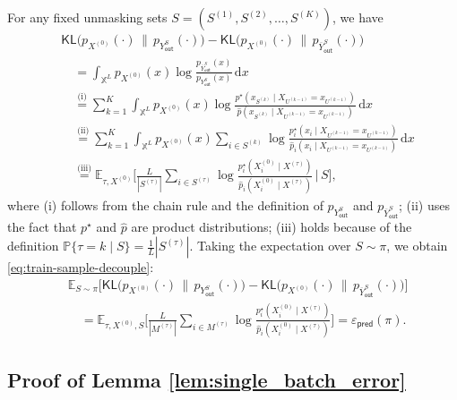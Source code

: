 \documentclass[english]{article}
\newcommand{\bP}{\mathbb{P}}
\newcommand{\KL}{\mathsf{KL}}
\newcommand{\diff}{\,\mathrm{d}}
\newcommand{\ol}{\overline}
\newcommand{\veps}{\varepsilon}
\newcommand{\train}{\mathsf{pred}}
\newcommand{\out}{\mathsf{out}}
\begin{document}
For any fixed unmasking sets $ S = (S^{(1)}, S^{(2)}, \ldots, S^{(K)} ) $, we have
\begin{align*}
    &\KL\big(p_{X^{(0)}}(\cdot) \,\|\, p_{Y_{\out}^S}(\cdot)\big) - \KL \big(p_{X^{(0)}}(\cdot) \,\|\, p_{\ol Y^S_{\out}}(\cdot)\big) \\
    &\quad = \int_{\mathbb{X}^L} p_{X^{(0)}}(x) \log \frac{p_{\ol Y^S_{\out}}(x)}{p_{Y_{\out}^S}(x)} \diff x \\
    &\quad \stackrel{\text{(i)}}{=} \sum_{k=1}^K \int_{\mathbb{X}^L} p_{X^{(0)}}(x) \log \frac{p^\star(x_{S^{(k)} }  \mid X_{U^{(k-1)} } = x_{U^{(k-1)} }  )}{\widehat{p}(x_{S^{(k)} }  \mid X_{U^{(k-1)} } = x_{U^{(k-1)} }  )} \diff x \\
    &\quad \stackrel{\text{(ii)}}{=} \sum_{k=1}^K \int_{\mathbb{X}^L} p_{X^{(0)}}(x) \sum_{i \in S^{(k)} } \log \frac{p_i^\star(x_i \mid X_{U^{(k-1)} } = x_{U^{(k-1)} } )}{\widehat{p}_i(x_i \mid X_{U^{(k-1)} } = x_{U^{(k-1)} } )} \diff x \\
    &\quad \stackrel{\text{(iii)}}{=} \mathbb{E}_{\tau, X^{(0)}} \Bigg[ \frac{L}{|S^{(\tau)}| } \sum_{i \in S^{(\tau)} } \log \frac{p_i^\star(X^{(0)}_i \mid X^{(\tau)} )}{\widehat{p}_i(X^{(0)}_i\mid X^{(\tau)} )} \, \Big| \, S \Bigg],
\end{align*}
where (i) follows from the chain rule and the definition of $ p_{Y_{\out}^S} $ and $ p_{\ol Y^S_{\out}} $;
(ii) uses the fact that $ p^{\star}  $ and $ \hat{p} $ are product distributions; 
(iii) holds because of the definition $ \bP\{\tau = k \mid S\} = \frac{1}{L}|S^{(\tau)} | $.
Taking the expectation over $ S \sim \pi $, we obtain \eqref{eq:train-sample-decouple}:
\begin{align*}
    &\mathbb{E}_{S \sim \pi} \Big[ \KL\big(p_{X^{(0)}}(\cdot) \,\|\, p_{Y_{\out}^S}(\cdot)\big) - \KL\big(p_{X^{(0)}}(\cdot) \,\|\, p_{\ol Y^S_{\out}}(\cdot)\big) \Big] \\
    &\quad = \mathbb{E}_{\tau, X^{(0)}, S} \Bigg[ \frac{L}{|M^{(\tau)} |} \sum_{i \in M^{(\tau)} } \log \frac{p_i^\star(X^{(0)}_i \mid X^{(\tau)} )}{\widehat{p}_i(X^{(0)}_i\mid X^{(\tau)} )} \Bigg] = \veps_{\train}(\pi).
\end{align*}

\subsection{Proof of Lemma \ref{lem:single_batch_error}}
\label{sec:proof-single_batch_error}
\end{document}
